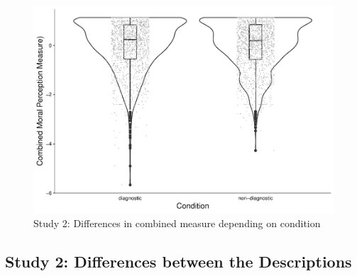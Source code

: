 \documentclass[
  american,
  man,mask,floatsintext]{apa6}
\begin{document}
\begin{figure}[!h]
\includegraphics[width=\textwidth,]{Supplementary_files/figure-latex/S3combinedconditionplot-1} \caption{Study 2: Differences in combined measure depending on condition}\label{fig:S3combinedconditionplot}
\end{figure}

\newpage

\hypertarget{study-2-differences-between-the-descriptions}{%
\subsection{Study 2: Differences between the Descriptions}\label{study-2-differences-between-the-descriptions}}

\newpage
\end{document}
